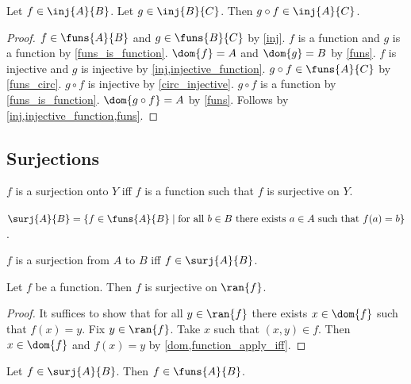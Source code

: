 \begin{proposition}\label{inj_circ}
    Let $f\in\inj{A}{B}$.
    Let $g\in\inj{B}{C}$.
    Then $g\circ f\in\inj{A}{C}$.
\end{proposition}
\begin{proof}
    $f\in\funs{A}{B}$ and $g\in\funs{B}{C}$ by \cref{inj}.
    $f$ is a function and $g$ is a function by \cref{funs_is_function}.
    $\dom{f}=A$ and $\dom{g}=B$ by \cref{funs}.
    $f$ is injective and $g$ is injective by \cref{inj,injective_function}.
    $g\circ f\in\funs{A}{C}$ by \cref{funs_circ}.
    $g\circ f$ is injective by \cref{circ_injective}.
    $g\circ f$ is a function by \cref{funs_is_function}.
    $\dom{g\circ f}=A$ by \cref{funs}.
    Follows by \cref{inj,injective_function,funs}.
\end{proof}

\subsection{Surjections}

\begin{abbreviation}\label{surjection}
    $f$ is a surjection onto $Y$ iff $f$ is a function such that $f$ is surjective on $Y$.
\end{abbreviation}

\begin{definition}\label{surj}
    $\surj{A}{B} = \{f\in\funs{A}{B}\mid \text{for all $b\in B$ there exists $a\in A$ such that $f(a) = b$}\}$.
\end{definition}

\begin{abbreviation}\label{surjection_from_to}
    $f$ is a surjection from $A$ to $B$ iff $f\in\surj{A}{B}$.
\end{abbreviation}

\begin{lemma}\label{surjection_ran}
    Let $f$ be a function.
    Then $f$ is surjective on $\ran{f}$.
\end{lemma}
\begin{proof}
    It suffices to show that for all $y\in\ran{f}$ there exists $x\in\dom{f}$ such that $f(x) = y$.
    Fix $y\in\ran{f}$.
    Take $x$ such that $(x,y)\in f$.
    Then $x\in\dom{f}$ and $f(x) = y$ by \cref{dom,function_apply_iff}.
\end{proof}

\begin{lemma}\label{surj_to_fun}
    Let $f\in\surj{A}{B}$.
    Then $f\in\funs{A}{B}$.
\end{lemma}

